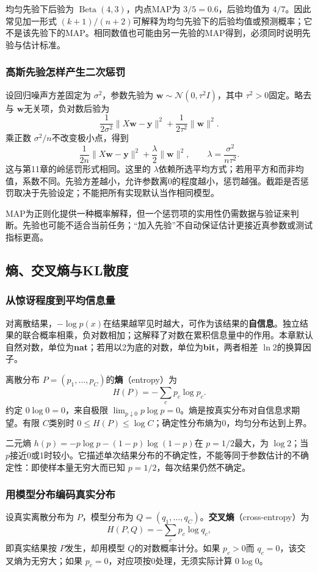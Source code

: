 \documentclass[UTF8,fontset=none,zihao=-4,a4paper]{ctexart}
\newcommand{\term}[1]{\textbf{#1}}
\numberwithin{equation}{section}
\numberwithin{figure}{section}
\begin{document}
均匀先验下后验为 $\operatorname{Beta}(4,3)$，内点MAP为 $3/5=0.6$，后验均值为 $4/7$。因此常见加一形式 $(k+1)/(n+2)$可解释为均匀先验下的后验均值或预测概率；它不是该先验下的MAP。相同数值也可能由另一先验的MAP得到，必须同时说明先验与估计标准。

\subsubsection{高斯先验怎样产生二次惩罚}
设回归噪声方差固定为 $\sigma^2$，参数先验为 $\symbf w\sim\mathcal N(0,\tau^2I)$，其中 $\tau^2>0$固定。略去与 $\symbf w$无关项，负对数后验为
\[
 \frac1{2\sigma^2}\|X\symbf w-\symbf y\|^2+\frac1{2\tau^2}\|\symbf w\|^2.
\]
乘正数 $\sigma^2/n$不改变极小点，得到
\[
 \frac1{2n}\|X\symbf w-\symbf y\|^2+\frac\lambda2\|\symbf w\|^2,
 \qquad\lambda=\frac{\sigma^2}{n\tau^2}.
\]
这与第11章的岭惩罚形式相同。这里的 $\lambda$依赖所选平均方式；若用平方和而非均值，系数不同。先验方差越小，允许参数离0的程度越小，惩罚越强。截距是否惩罚取决于先验设定；不能把所有实现默认当作相同模型。

MAP为正则化提供一种概率解释，但一个惩罚项的实用性仍需数据与验证来判断。先验也可能不适合当前任务；“加入先验”不自动保证估计更接近真参数或测试指标更高。

\subsection{熵、交叉熵与KL散度}
\subsubsection{从惊讶程度到平均信息量}
对离散结果，$-\log p(x)$在结果越罕见时越大，可作为该结果的\term{自信息}。独立结果的联合概率相乘，负对数相加；这解释了对数在累积信息量中的作用。本章默认自然对数，单位为\term{nat}；若用以2为底的对数，单位为\term{bit}，两者相差 $\ln2$的换算因子。

离散分布 $P=(p_1,\ldots,p_C)$的\term{熵}（entropy）为
\[
 H(P)=-\sum_cp_c\log p_c.
\]
约定 $0\log0=0$，来自极限 $\lim_{p\downarrow0}p\log p=0$。熵是按真实分布对自信息求期望。有限 $C$类别时 $0\le H(P)\le\log C$；确定性分布熵为0，均匀分布达到上界。

二元熵 $h(p)=-p\log p-(1-p)\log(1-p)$在 $p=1/2$最大，为 $\log2$；当 $p$接近0或1时较小。它描述单次结果分布的不确定性，不能等同于参数估计的不确定性：即使样本量无穷大而已知 $p=1/2$，每次结果仍然不确定。

\subsubsection{用模型分布编码真实分布}
设真实离散分布为 $P$，模型分布为 $Q=(q_1,\ldots,q_C)$。\term{交叉熵}（cross-entropy）为
\[
 H(P,Q)=-\sum_cp_c\log q_c,
\]
即真实结果按 $P$发生，却用模型 $Q$的对数概率计分。如果 $p_c>0$而 $q_c=0$，该交叉熵为无穷大；如果 $p_c=0$，对应项按0处理，无须实际计算 $0\log0$。
\end{document}
